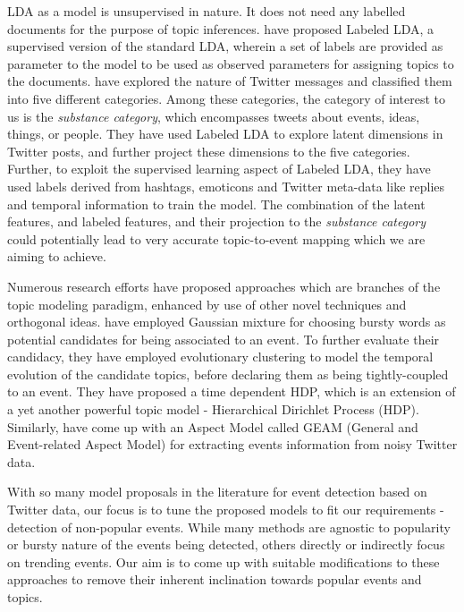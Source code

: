 LDA as a model is unsupervised in nature. It does not need any labelled documents for the purpose of topic inferences. \cite{ramage2009labeled} have proposed Labeled LDA, a supervised version of the standard LDA, wherein a set of labels are provided as parameter to the model to be used as observed parameters for assigning topics to the documents. \cite{ramage2010characterizing} have explored the nature of Twitter messages and classified them into five different categories. Among these categories, the category of interest to us is the \emph{substance category}, which encompasses tweets about events, ideas, things, or people. They have used Labeled LDA to explore latent dimensions in Twitter posts, and further project these dimensions to the five categories. Further, to exploit the supervised learning aspect of Labeled LDA, they have used labels derived from hashtags, emoticons and Twitter meta-data like replies and temporal information to train the model. The combination of the latent features, and labeled features, and their projection to the \emph{substance category} could potentially lead to very accurate topic-to-event mapping which we are aiming to achieve.

Numerous research efforts have proposed approaches which are branches of the topic modeling paradigm, enhanced by use of other novel techniques and orthogonal ideas. \cite{wang2013real} have employed Gaussian mixture for choosing bursty words as potential candidates for being associated to an event. To further evaluate their candidacy, they have employed evolutionary clustering to model the temporal evolution of the candidate topics, before declaring them as being tightly-coupled to an event. They have proposed a time dependent HDP, which is an extension of a yet another powerful topic model - Hierarchical Dirichlet Process (HDP). Similarly, \cite{you2013geam} have come up with an Aspect Model called GEAM (General and Event-related Aspect Model) for extracting events information from noisy Twitter data.

With so many model proposals in the literature for event detection based on Twitter data, our focus is to tune the proposed models to fit our requirements - detection of non-popular events. While many methods are agnostic to popularity or bursty nature of the events being detected, others directly or indirectly focus on trending events. Our aim is to come up with suitable modifications to these approaches to remove their inherent inclination towards popular events and topics.

